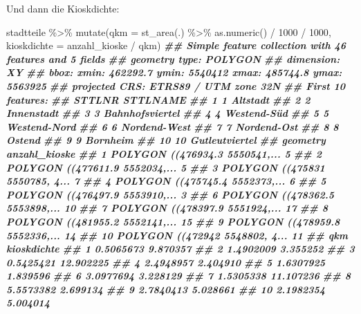 \documentclass[
  ngerman,
]{article}
\newenvironment{Shaded}{\begin{snugshade}}{\end{snugshade}}
\newcommand{\AttributeTok}[1]{\textcolor[rgb]{0.77,0.63,0.00}{#1}}
\newcommand{\DecValTok}[1]{\textcolor[rgb]{0.00,0.00,0.81}{#1}}
\newcommand{\DocumentationTok}[1]{\textcolor[rgb]{0.56,0.35,0.01}{\textbf{\textit{#1}}}}
\newcommand{\FunctionTok}[1]{\textcolor[rgb]{0.00,0.00,0.00}{#1}}
\newcommand{\NormalTok}[1]{#1}
\newcommand{\SpecialCharTok}[1]{\textcolor[rgb]{0.00,0.00,0.00}{#1}}
\begin{document}
Und dann die Kioskdichte:

\begin{Shaded}
\begin{Highlighting}[]
\NormalTok{stadtteile }\SpecialCharTok{\%\textgreater{}\%}
  \FunctionTok{mutate}\NormalTok{(}\AttributeTok{qkm =} \FunctionTok{st\_area}\NormalTok{(.) }\SpecialCharTok{\%\textgreater{}\%} \FunctionTok{as.numeric}\NormalTok{() }\SpecialCharTok{/} \DecValTok{1000} \SpecialCharTok{/} \DecValTok{1000}\NormalTok{,}
         \AttributeTok{kioskdichte =}\NormalTok{ anzahl\_kioske }\SpecialCharTok{/}\NormalTok{ qkm)}
\DocumentationTok{\#\# Simple feature collection with 46 features and 5 fields}
\DocumentationTok{\#\# geometry type:  POLYGON}
\DocumentationTok{\#\# dimension:      XY}
\DocumentationTok{\#\# bbox:           xmin: 462292.7 ymin: 5540412 xmax: 485744.8 ymax: 5563925}
\DocumentationTok{\#\# projected CRS:  ETRS89 / UTM zone 32N}
\DocumentationTok{\#\# First 10 features:}
\DocumentationTok{\#\#    STTLNR        STTLNAME}
\DocumentationTok{\#\# 1       1        Altstadt}
\DocumentationTok{\#\# 2       2      Innenstadt}
\DocumentationTok{\#\# 3       3 Bahnhofsviertel}
\DocumentationTok{\#\# 4       4     Westend{-}Süd}
\DocumentationTok{\#\# 5       5    Westend{-}Nord}
\DocumentationTok{\#\# 6       6    Nordend{-}West}
\DocumentationTok{\#\# 7       7     Nordend{-}Ost}
\DocumentationTok{\#\# 8       8          Ostend}
\DocumentationTok{\#\# 9       9        Bornheim}
\DocumentationTok{\#\# 10     10  Gutleutviertel}
\DocumentationTok{\#\#                          geometry anzahl\_kioske}
\DocumentationTok{\#\# 1  POLYGON ((476934.3 5550541,...             5}
\DocumentationTok{\#\# 2  POLYGON ((477611.9 5552034,...             5}
\DocumentationTok{\#\# 3  POLYGON ((475831 5550785, 4...             7}
\DocumentationTok{\#\# 4  POLYGON ((475745.4 5552373,...             6}
\DocumentationTok{\#\# 5  POLYGON ((476497.9 5553910,...             3}
\DocumentationTok{\#\# 6  POLYGON ((478362.5 5553898,...            10}
\DocumentationTok{\#\# 7  POLYGON ((478397.9 5551924,...            17}
\DocumentationTok{\#\# 8  POLYGON ((481955.2 5552141,...            15}
\DocumentationTok{\#\# 9  POLYGON ((478959.8 5552336,...            14}
\DocumentationTok{\#\# 10 POLYGON ((472942 5548802, 4...            11}
\DocumentationTok{\#\#          qkm kioskdichte}
\DocumentationTok{\#\# 1  0.5065673    9.870357}
\DocumentationTok{\#\# 2  1.4902009    3.355252}
\DocumentationTok{\#\# 3  0.5425421   12.902225}
\DocumentationTok{\#\# 4  2.4948957    2.404910}
\DocumentationTok{\#\# 5  1.6307925    1.839596}
\DocumentationTok{\#\# 6  3.0977694    3.228129}
\DocumentationTok{\#\# 7  1.5305338   11.107236}
\DocumentationTok{\#\# 8  5.5573382    2.699134}
\DocumentationTok{\#\# 9  2.7840413    5.028661}
\DocumentationTok{\#\# 10 2.1982354    5.004014}
\end{Highlighting}
\end{Shaded}
\end{document}

